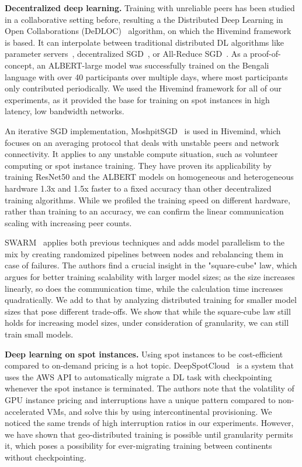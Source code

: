 \textbf{Decentralized deep learning.}
Training with unreliable peers has been studied in a collaborative setting before, resulting a the Distributed Deep Learning in Open Collaborations (DeDLOC)~\cite{diskin2021distributed} algorithm, on which the Hivemind framework~\cite{hivemind} is based.
It can interpolate between traditional distributed DL algorithms like parameter servers~\cite{li2014scaling}, decentralized SGD~\cite{lian2017can}, or All-Reduce SGD~\cite{sergeev2018horovod}.
As a proof-of-concept, an ALBERT-large model was successfully trained on the Bengali language with over 40 participants over multiple days, where most participants only contributed periodically.
We used the Hivemind framework for all of our experiments, as it provided the base for training on spot instances in high latency, low bandwidth networks.

An iterative SGD implementation, MoshpitSGD~\cite{ryabinin2021moshpit} is used in Hivemind, which focuses on an averaging protocol that deals with unstable peers and network connectivity.
It applies to any unstable compute situation, such as volunteer computing or spot instance training.
They have proven its applicability by training ResNet50 and the ALBERT models on homogeneous and heterogeneous hardware 1.3x and 1.5x faster to a fixed accuracy than other decentralized training algorithms.
While we profiled the training speed on different hardware, rather than training to an accuracy, we can confirm the linear communication scaling with increasing peer counts.

SWARM~\cite{ryabinin2023swarm} applies both previous techniques and adds model parallelism to the mix by creating randomized pipelines between nodes and rebalancing them in case of failures.
The authors find a crucial insight in the "square-cube" law, which argues for better training scalability with larger model sizes; as the size increases linearly, so does the communication time, while the calculation time increases quadratically.
We add to that by analyzing distributed training for smaller model sizes that pose different trade-offs. 
We show that while the square-cube law still holds for increasing model sizes, under consideration of granularity, we can still train small models.

\textbf{Deep learning on spot instances.}
Using spot instances to be cost-efficient compared to on-demand pricing is a hot topic.
DeepSpotCloud~\cite{lee2017deepspotcloud} is a system that uses the AWS API to automatically migrate a DL task with checkpointing whenever the spot instance is terminated.
The authors note that the volatility of GPU instance pricing and interruptions have a unique pattern compared to non-accelerated VMs, and solve this by using intercontinental provisioning.
We noticed the same trends of high interruption ratios in our experiments.
However, we have shown that geo-distributed training is possible until granularity permits it, which poses a possibility for ever-migrating training between continents without checkpointing. 

